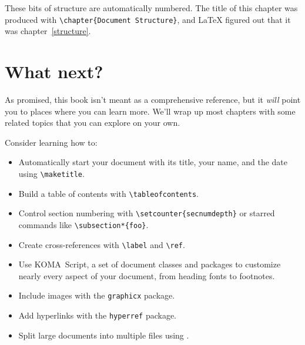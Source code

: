 These bits of structure are automatically numbered.
The title of this chapter was produced with \verb|\chapter{Document Structure}|,
and \LaTeX{} figured out that it was chapter~\ref{structure}.

\section{What next?}

As promised, this book isn't meant as a comprehensive reference,
but it \emph{will} point you to places where you can learn more.
We'll wrap up most chapters with some related topics that you can
explore on your own.

Consider learning how to:
\begin{itemize}
\item Automatically start your document with its title, your name,
    and the date using \verb|\maketitle|.
\item Build a table of contents
    with \verb|\tableofcontents|.
\item Control section numbering with \verb|\setcounter{secnumdepth}|
or starred commands like \verb|\subsection*{foo}|.
\item Create cross-references with \verb|\label| and \verb|\ref|.
\item Use KOMA~Script, a set of document classes and packages
to customize nearly every aspect of your document,
from heading fonts to footnotes.
\item Include images with the \texttt{graphicx} package.
\item Add hyperlinks with the \texttt{hyperref} package.
\item Split large documents into multiple files using \verb||.
\end{itemize}
